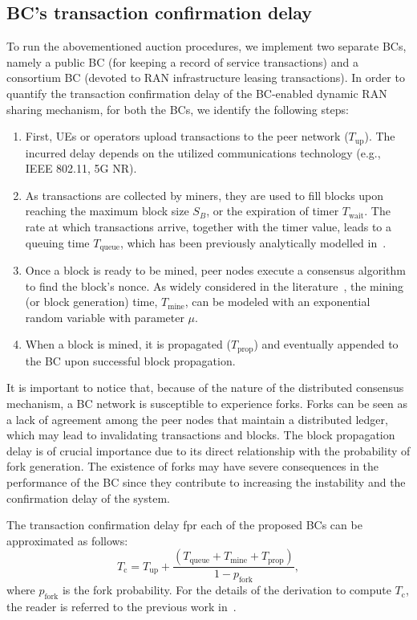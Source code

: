 \documentclass[conference]{IEEEtran}
\theoremstyle{definition}
\begin{document}
\subsection{BC's transaction confirmation delay}
To run the abovementioned auction procedures, we implement two separate BCs, namely a public BC (for keeping a record of service transactions) and a consortium BC (devoted to RAN infrastructure leasing transactions). In order to quantify the transaction confirmation delay of the BC-enabled dynamic RAN sharing mechanism, for both the BCs, we identify the following steps:
\begin{enumerate}
    \item First, UEs or operators upload transactions to the peer network ($T_\text{up}$). The incurred delay depends on the utilized communications technology (e.g., IEEE 802.11, 5G NR). 
    \item As transactions are collected by miners, they are used to fill blocks upon reaching the maximum block size $S_B$, or the expiration of timer $T_\text{wait}$. The rate at which transactions arrive, together with the timer value, leads to a queuing time $T_\text{queue}$, which has been previously analytically modelled in~\cite{wilhelmi2021discrete}.
    \item Once a block is ready to be mined, peer nodes execute a consensus algorithm to find the block's nonce. As widely considered in the literature~\cite{decker2013information, biais2019blockchain}, the mining (or block generation) time, $T_\text{mine}$, can be modeled with an exponential random variable with parameter $\mu$.
    \item When a block is mined, it is propagated ($T_\text{prop}$) and eventually appended to the BC upon successful block propagation.
\end{enumerate}

It is important to notice that, because of the nature of the distributed consensus mechanism, a BC network is susceptible to experience forks. Forks can be seen as a lack of agreement among the peer nodes that maintain a distributed ledger, which may lead to invalidating transactions and blocks. The block propagation delay is of crucial importance due to its direct relationship with the probability of fork generation. The existence of forks may have severe consequences in the performance of the BC since they contribute to increasing the instability and the confirmation delay of the system.

The transaction confirmation delay fpr each of the proposed BCs can be approximated as follows:
\begin{equation}
    T_\text{c} = T_\text{up} + \frac{(T_\text{queue} + T_\text{mine} + T_\text{prop})}{1-p_\text{fork}},
\end{equation}
where $p_\text{fork}$ is the fork probability. For the details of the derivation to compute $T_\text{c}$, the reader is referred to the previous work in~\cite{wilhelmi2021discrete}.
\end{document}
